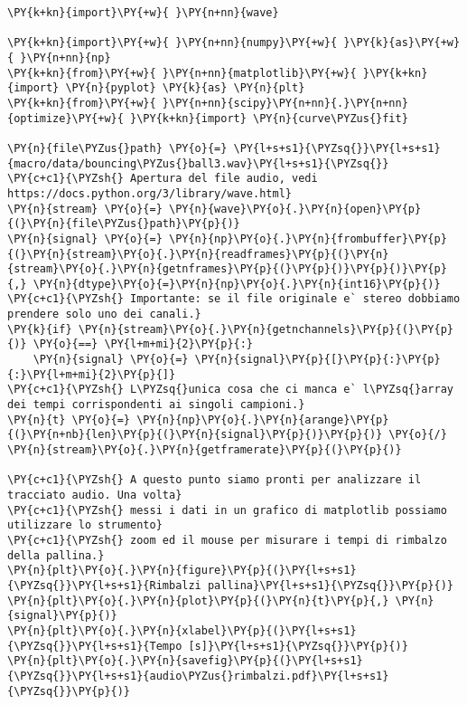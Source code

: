 \begin{Verbatim}[label=\makebox{\href{https://github.com/unipi-physics-labs/lab1-sheets/tree/main/snippy/dad_palla.py}{https://github.com/.../dad\_palla.py}},commandchars=\\\{\}]
\PY{k+kn}{import}\PY{+w}{ }\PY{n+nn}{wave}

\PY{k+kn}{import}\PY{+w}{ }\PY{n+nn}{numpy}\PY{+w}{ }\PY{k}{as}\PY{+w}{ }\PY{n+nn}{np}
\PY{k+kn}{from}\PY{+w}{ }\PY{n+nn}{matplotlib}\PY{+w}{ }\PY{k+kn}{import} \PY{n}{pyplot} \PY{k}{as} \PY{n}{plt}
\PY{k+kn}{from}\PY{+w}{ }\PY{n+nn}{scipy}\PY{n+nn}{.}\PY{n+nn}{optimize}\PY{+w}{ }\PY{k+kn}{import} \PY{n}{curve\PYZus{}fit}

\PY{n}{file\PYZus{}path} \PY{o}{=} \PY{l+s+s1}{\PYZsq{}}\PY{l+s+s1}{macro/data/bouncing\PYZus{}ball3.wav}\PY{l+s+s1}{\PYZsq{}}
\PY{c+c1}{\PYZsh{} Apertura del file audio, vedi https://docs.python.org/3/library/wave.html}
\PY{n}{stream} \PY{o}{=} \PY{n}{wave}\PY{o}{.}\PY{n}{open}\PY{p}{(}\PY{n}{file\PYZus{}path}\PY{p}{)}
\PY{n}{signal} \PY{o}{=} \PY{n}{np}\PY{o}{.}\PY{n}{frombuffer}\PY{p}{(}\PY{n}{stream}\PY{o}{.}\PY{n}{readframes}\PY{p}{(}\PY{n}{stream}\PY{o}{.}\PY{n}{getnframes}\PY{p}{(}\PY{p}{)}\PY{p}{)}\PY{p}{,} \PY{n}{dtype}\PY{o}{=}\PY{n}{np}\PY{o}{.}\PY{n}{int16}\PY{p}{)}
\PY{c+c1}{\PYZsh{} Importante: se il file originale e` stereo dobbiamo prendere solo uno dei canali.}
\PY{k}{if} \PY{n}{stream}\PY{o}{.}\PY{n}{getnchannels}\PY{p}{(}\PY{p}{)} \PY{o}{==} \PY{l+m+mi}{2}\PY{p}{:}
    \PY{n}{signal} \PY{o}{=} \PY{n}{signal}\PY{p}{[}\PY{p}{:}\PY{p}{:}\PY{l+m+mi}{2}\PY{p}{]}
\PY{c+c1}{\PYZsh{} L\PYZsq{}unica cosa che ci manca e` l\PYZsq{}array dei tempi corrispondenti ai singoli campioni.}
\PY{n}{t} \PY{o}{=} \PY{n}{np}\PY{o}{.}\PY{n}{arange}\PY{p}{(}\PY{n+nb}{len}\PY{p}{(}\PY{n}{signal}\PY{p}{)}\PY{p}{)} \PY{o}{/} \PY{n}{stream}\PY{o}{.}\PY{n}{getframerate}\PY{p}{(}\PY{p}{)}

\PY{c+c1}{\PYZsh{} A questo punto siamo pronti per analizzare il tracciato audio. Una volta}
\PY{c+c1}{\PYZsh{} messi i dati in un grafico di matplotlib possiamo utilizzare lo strumento}
\PY{c+c1}{\PYZsh{} zoom ed il mouse per misurare i tempi di rimbalzo della pallina.}
\PY{n}{plt}\PY{o}{.}\PY{n}{figure}\PY{p}{(}\PY{l+s+s1}{\PYZsq{}}\PY{l+s+s1}{Rimbalzi pallina}\PY{l+s+s1}{\PYZsq{}}\PY{p}{)}
\PY{n}{plt}\PY{o}{.}\PY{n}{plot}\PY{p}{(}\PY{n}{t}\PY{p}{,} \PY{n}{signal}\PY{p}{)}
\PY{n}{plt}\PY{o}{.}\PY{n}{xlabel}\PY{p}{(}\PY{l+s+s1}{\PYZsq{}}\PY{l+s+s1}{Tempo [s]}\PY{l+s+s1}{\PYZsq{}}\PY{p}{)}
\PY{n}{plt}\PY{o}{.}\PY{n}{savefig}\PY{p}{(}\PY{l+s+s1}{\PYZsq{}}\PY{l+s+s1}{audio\PYZus{}rimbalzi.pdf}\PY{l+s+s1}{\PYZsq{}}\PY{p}{)}


\end{Verbatim}

